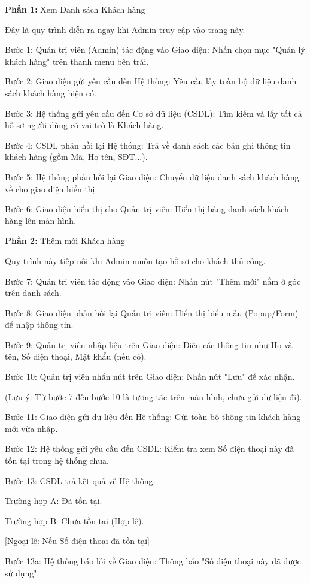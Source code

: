 \documentclass[../BTL.tex]{subfiles}
\begin{document}
\textbf{Phần 1:} Xem Danh sách Khách hàng

Đây là quy trình diễn ra ngay khi Admin truy cập vào trang này.

Bước 1: Quản trị viên (Admin) tác động vào Giao diện: Nhấn chọn mục
"Quản lý khách hàng" trên thanh menu bên trái.

Bước 2: Giao diện gửi yêu cầu đến Hệ thống: Yêu cầu lấy toàn bộ dữ liệu
danh sách khách hàng hiện có.

Bước 3: Hệ thống gửi yêu cầu đến Cơ sở dữ liệu (CSDL): Tìm kiếm và lấy
tất cả hồ sơ người dùng có vai trò là Khách hàng.

Bước 4: CSDL phản hồi lại Hệ thống: Trả về danh sách các bản ghi thông
tin khách hàng (gồm Mã, Họ tên, SĐT...).

Bước 5: Hệ thống phản hồi lại Giao diện: Chuyển dữ liệu danh sách khách
hàng về cho giao diện hiển thị.

Bước 6: Giao diện hiển thị cho Quản trị viên: Hiển thị bảng danh sách
khách hàng lên màn hình.

\textbf{Phần 2:} Thêm mới Khách hàng

Quy trình này tiếp nối khi Admin muốn tạo hồ sơ cho khách thủ công.

Bước 7: Quản trị viên tác động vào Giao diện: Nhấn nút "Thêm mới" nằm ở
góc trên danh sách.

Bước 8: Giao diện phản hồi lại Quản trị viên: Hiển thị biểu mẫu
(Popup/Form) để nhập thông tin.

Bước 9: Quản trị viên nhập liệu trên Giao diện: Điền các thông tin như
Họ và tên, Số điện thoại, Mật khẩu (nếu có).

Bước 10: Quản trị viên nhấn nút trên Giao diện: Nhấn nút "Lưu" để xác
nhận.

(Lưu ý: Từ bước 7 đến bước 10 là tương tác trên màn hình, chưa gửi dữ
liệu đi).

Bước 11: Giao diện gửi dữ liệu đến Hệ thống: Gửi toàn bộ thông tin khách
hàng mới vừa nhập.

Bước 12: Hệ thống gửi yêu cầu đến CSDL: Kiểm tra xem Số điện thoại này
đã tồn tại trong hệ thống chưa.

Bước 13: CSDL trả kết quả về Hệ thống:

Trường hợp A: Đã tồn tại.

Trường hợp B: Chưa tồn tại (Hợp lệ).

{[}Ngoại lệ: Nếu Số điện thoại đã tồn tại{]}

Bước 13a: Hệ thống báo lỗi về Giao diện: Thông báo "Số điện thoại này đã
được sử dụng".
\end{document}
